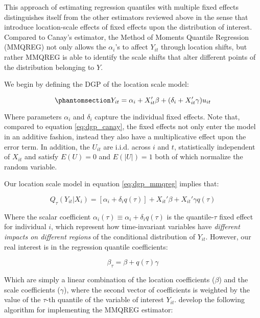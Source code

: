 \documentclass[bib]{statapress}
\begin{document}
This approach of estimating regression quantiles with multiple fixed
effects distinguishes itself from the other estimators reviewed above in
the sense that \citep{mss2019} introduce location-scale effects of fixed
effects upon the distribution of interest. Compared to Canay's
estimator, the Method of Moments Quantile Regression (MMQREG) not only
allows the \(\alpha_i\)'s to affect \(Y_{it}\) through location shifts,
but rather MMQREG is able to identify the scale shifts that alter
different points of the distribution belonging to \(Y\).

We begin by defining the DGP of the location scale model:

\begin{equation}\phantomsection\label{eq-dgp_mmqreg}{Y_{it} = \alpha_i + X_{it}' \beta + (\delta_i + X_{it}' \gamma) u_{it}
}\end{equation}

Where parameters \(\alpha_i\) and \(\delta_i\) capture the individual
fixed effects. Note that, compared to equation
\hyperref[eq:dgp_canay]{{[}eq:dgp\_canay{]}}, the fixed effects not only
enter the model in an additive fashion, instead they also have a
multiplicative effect upon the error term. In addition, the \(U_{it}\)
are i.i.d. across \(i\) and \(t\), statistically independent of
\(X_{it}\) and satisfy \(E(U) = 0\) and \(E(|U|) = 1\) both of which
normalize the random variable.

Our location scale model in equation
\hyperref[eq:dgp_mmqreg]{{[}eq:dgp\_mmqreg{]}} implies that:

\[\label{eq:mmqreg_quantile}
    Q_{\tau}(Y_{it}|X_i) = [\alpha_i + \delta_i q(\tau)] + X_{it}' \beta + X_{it}' \gamma q(\tau)\]

Where the scalar coefficient
\(\alpha_i(\tau) \equiv \alpha_i + \delta_i q(\tau)\) is the
quantile-\(\tau\) fixed effect for individual \(i\), which represent how
time-invariant variables have \emph{different impacts on different
regions} of the conditional distribution of \(Y_{it}\). However, our
real interest is in the regression quantile coefficients:

\[\label{eq:rqcoefficients_mmqreg}
    \beta_{\tau} = \beta + q(\tau) \gamma\]

Which are simply a linear combination of the location coefficients
(\(\beta\)) and the scale coefficients (\(\gamma\)), where the second
vector of coefficients is weighted by the value of the \(\tau\)-th
quantile of the variable of interest \(Y_{it}\). \citep{mss2019} develop
the following algorithm for implementing the MMQREG estimator:
\end{document}
